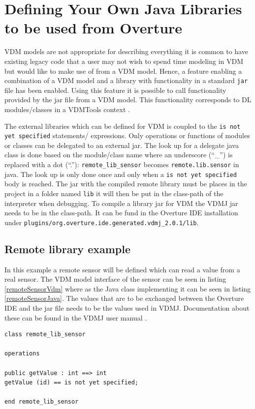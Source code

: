 \documentclass{overturerepsec}
\begin{document}
\section{Defining Your Own Java Libraries to be used from Overture}\label{sec:javalibs}

VDM models are not appropriate for describing everything it is common to have existing legacy code that a user may not
wish to spend time modeling in VDM but would like to make use of
from a VDM model. Hence, a feature enabling a combination of a VDM
model and a library with functionality in a standard \texttt{jar} file
has been enabled. Using this feature it is possible 
to call functionality provided by the jar file from a VDM model. This functionality
corresponds to DL modules/classes in a VDMTools context \cite{DLMan}.

The external libraries which can be defined for VDM is coupled to the
\texttt{is not yet specified} statements/ expressions. Only operations
or functions of modules or classes can be delegated to an external
jar. The look up for a delegate java class is done based on the
module/class name where an underscore (``\_'') is replaced with a dot
(``.''): \texttt{remote\_lib\_sensor} becomes
\texttt{remote.lib.sensor} in java. The look up is only done once and
only when a \texttt{is not yet specified} body is
reached. The jar with the compiled remote library must be places in
the project in a folder named \texttt{lib} it will then be put in the
class-path of the interpreter when debugging. To compile a library jar
for VDM the VDMJ jar needs to be in the class-path. It can be fund in
the Overture IDE installation under
\texttt{plugins/org.overture.ide.generated.vdmj\_2.0.1/lib}.

\subsection{Remote library example}

In this example a remote sensor will be defined which can read a
value from a real sensor. The VDM model interface of the sensor can be
seen in listing \ref{remoteSensorVdm} where as the Java class
implementing it can be seen in listing \ref{remoteSensorJava}. The
values that are to be exchanged between the Overture IDE and the jar
file needs to be the values used in VDMJ. Documentation about these
can be found in the VDMJ user manual \cite{Battle09}.

\begin{lstlisting}[language=VDM++,label=remoteSensorVdm,caption=Remote sensor VDM class,captionpos=b]
class remote_lib_sensor

operations

public getValue : int ==> int
getValue (id) == is not yet specified;

end remote_lib_sensor
\end{lstlisting}
\end{document}
